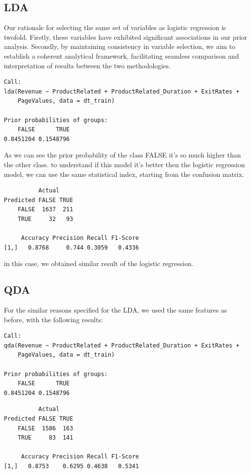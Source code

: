 \documentclass[
]{article}
\begin{document}
\subsection{LDA}\label{lda}

Our rationale for selecting the same set of variables as logistic
regression is twofold. Firstly, these variables have exhibited
significant associations in our prior analysis. Secondly, by maintaining
consistency in variable selection, we aim to establish a coherent
analytical framework, facilitating seamless comparison and
interpretation of results between the two methodologies.

\begin{verbatim}
Call:
lda(Revenue ~ ProductRelated + ProductRelated_Duration + ExitRates + 
    PageValues, data = dt_train)

Prior probabilities of groups:
    FALSE      TRUE 
0.8451204 0.1548796 
\end{verbatim}

As we can see the prior probability of the class FALSE it's so much
higher than the other class. to understand if this model it's better
then the logistic regression model, we can use the same statistical
index, starting from the confusion matrix.

\newpage

\begin{verbatim}
          Actual
Predicted FALSE TRUE
    FALSE  1637  211
    TRUE     32   93

     Accuracy Precision Recall F1-Score
[1,]   0.8768     0.744 0.3059   0.4336
\end{verbatim}

in this case, we obtained similar result of the logistic regression.

\subsection{QDA}\label{qda}

For the similar reasons specified for the LDA, we used the same features
as before, with the following results:

\begin{verbatim}
Call:
qda(Revenue ~ ProductRelated + ProductRelated_Duration + ExitRates + 
    PageValues, data = dt_train)

Prior probabilities of groups:
    FALSE      TRUE 
0.8451204 0.1548796 
\end{verbatim}

\begin{verbatim}
          Actual
Predicted FALSE TRUE
    FALSE  1586  163
    TRUE     83  141

     Accuracy Precision Recall F1-Score
[1,]   0.8753    0.6295 0.4638   0.5341
\end{verbatim}
\end{document}

